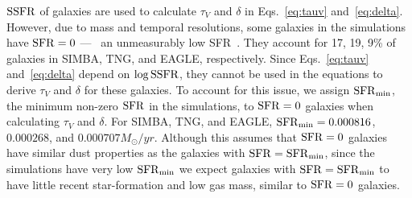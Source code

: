 

${\rm SSFR}$ of galaxies are used to calculate $\tau_V$ and $\delta$ in
Eqs.~\ref{eq:tauv} and~\ref{eq:delta}. However, due to mass and temporal resolutions,
some galaxies in the simulations have ${\rm SFR}=0$ --- \ie~an unmeasurably low
SFR~\citep{hahn2019c}. They account for 17, 19, 9\% of galaxies
in SIMBA, TNG, and EAGLE, respectively. Since Eqs.~\ref{eq:tauv}
and~\ref{eq:delta} depend on $\log{\rm SSFR}$, they cannot be used in the equations
to derive $\tau_V$ and $\delta$ for these galaxies. To account for this issue,
we assign ${\rm SFR}_{\rm min}$, the minimum non-zero ${\rm SFR}$ in the simulations, to
${\rm SFR}=0$ galaxies when calculating $\tau_V$ and $\delta$. For SIMBA, TNG, and
EAGLE, ${\rm SFR}_{\rm min}=0.000816$, $0.000268$, and $0.000707 M_\odot/yr$. Although 
this assumes that ${\rm SFR}=0$ galaxies have similar dust properties as the galaxies 
with ${\rm SFR} = {\rm SFR}_{\rm min}$, since the simulations have very low ${\rm SFR}_{\rm min}$ 
we expect galaxies with ${\rm SFR} = {\rm SFR}_{\rm min}$ to have little recent
star-formation and low gas mass, similar to ${\rm SFR}=0$ galaxies. 


